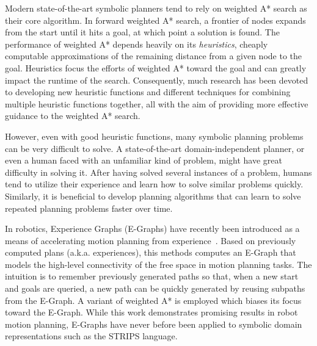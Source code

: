 \documentclass[letterpaper]{article}
\begin{document}

Modern state-of-the-art symbolic planners tend to rely on weighted A* search as their core algorithm.
In forward weighted A* search, a frontier of nodes expands from the start until it hits a goal, at which point a solution is found.
The performance of weighted A* depends heavily on its \textit{heuristics}, cheaply computable approximations of the remaining distance from a given node to the goal. Heuristics focus the efforts of weighted A* toward the goal and can greatly impact the runtime of the search.
Consequently, much research has been devoted to developing new heuristic functions and different techniques for combining multiple heuristic functions together, all with the aim of providing more effective guidance to the weighted A* search.

However, even with good heuristic functions, many symbolic planning problems can be very difficult to solve.
A state-of-the-art domain-independent planner, or even a human faced with an unfamiliar kind of problem, might have great difficulty in solving it.
After having solved several instances of a problem, humans tend to utilize their experience and learn how to solve similar problems quickly.
Similarly, it is beneficial to develop planning algorithms that can learn to solve repeated planning problems faster over time.

In robotics, Experience Graphs (E-Graphs) have recently been introduced as a means of accelerating motion planning from experience~\cite{phillips2012graphs}.
Based on previously computed plans (a.k.a. experiences), this methods computes an E-Graph that models the high-level connectivity of the free space in motion planning tasks.
The intuition is to remember previously generated paths so that, when a new start and goals are queried, a new path can be quickly generated by reusing subpaths from the E-Graph.
A variant of weighted A* is employed which biases its focus toward the E-Graph.
While this work demonstrates promising results in robot motion planning, E-Graphs have never before been applied to symbolic domain representations such as the STRIPS language.
\end{document}
